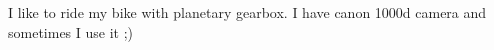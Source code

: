 \documentclass[11pt,a4paper,sans]{moderncv} %
\begin{document}
\renewcommand{\listitemsymbol}{-~} %

I like to ride my bike with planetary gearbox. I have canon 1000d camera and 
sometimes I use it ;)  








\end{document}
